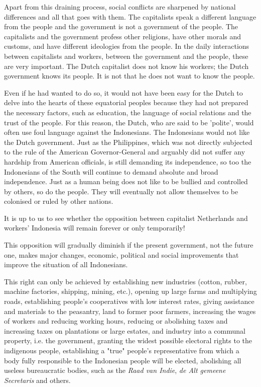 Apart from this draining process, social conflicts are sharpened by national differences and all 
that goes with them. The capitalists speak a different language from the people and the government is 
not a government of the people. The capitalists and the government profess other religions, have other 
morals and customs, and have different ideologies from the people. In the daily interactions between 
capitalists and workers, between the government and the people, these are very important. The Dutch 
capitalist does not know his workers; the Dutch government knows its people. It is not that he does not want to know the people.\nline

Even if he had wanted to do so, it would not have been easy for the Dutch to delve into the hearts of 
these equatorial peoples because they had not prepared the necessary factors, such as education, the 
language of social relations and the trust of the people. For this reason, the Dutch, who are said to 
be 'polite', would often use foul language against the Indonesians. The Indonesians would not like the 
Dutch government. Just as the Philippines, which was not directly subjected to the rule of the American 
Governor-General and arguably did not suffer any hardship from American officials, is still demanding 
its independence, so too the Indonesians of the South will continue to demand absolute and broad independence. 
Just as a human being does not like to be bullied and controlled by others, so do the people. They will 
eventually not allow themselves to be colonised or ruled by other nations.\nline

It is up to us to see whether the opposition between capitalist Netherlands and workers' Indonesia will remain forever or only temporarily!\nline

This opposition will gradually diminish if the present government, not the future one, 
makes major changes, economic, political and social improvements that improve the situation of all Indonesians.\nline

This right can only be achieved by establishing new industries (cotton, rubber, machine factories, shipping, mining, etc.), 
opening up large farms and multiplying roads, establishing people's cooperatives with low interest rates, giving assistance 
and materials to the peasantry, land to former poor farmers, increasing the wages of workers and reducing working hours, 
reducing or abolishing taxes and increasing taxes on plantations or large estates, and industry into a communal property, 
i.e. the government, granting the widest possible electoral rights to the indigenous people, establishing a "true" people's 
representative from which a body fully responsible to the Indonesian people will be elected, abolishing all useless bureaucratic 
bodies, such as the \emph{Raad van Indie}, \emph{de Alt gemeene Secretaris} and others.

